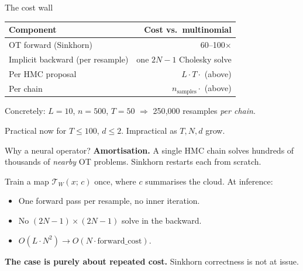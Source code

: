 \documentclass[10pt,aspectratio=169]{beamer}
\newcommand{\Tmap}{\mathcal{T}}
\begin{document}
\begin{frame}{The cost wall}
  \begin{center}
  \begin{tabular}{lr}
    \toprule
    Component & Cost vs.\ multinomial \\
    \midrule
    OT forward (Sinkhorn) & 60--100$\times$ \\
    Implicit backward (per resample) & one $2N{-}1$ Cholesky solve \\
    Per HMC proposal & $L \cdot T \cdot$ (above) \\
    Per chain & $n_\text{samples} \cdot$ (above) \\
    \bottomrule
  \end{tabular}
  \end{center}

  \medskip
  Concretely: $L{=}10$, $n{=}500$, $T{=}50$ $\Rightarrow$ 250{,}000 resamples \emph{per chain}.

  \medskip
  Practical now for $T \le 100$, $d \le 2$. Impractical as $T, N, d$ grow.
\end{frame}

\begin{frame}{Why a neural operator?}
  \textbf{Amortisation.} A single HMC chain solves hundreds of thousands of \emph{nearby} OT problems. Sinkhorn restarts each from scratch.

  \medskip
  Train a map $\Tmap_W(x;\, c)$ once, where $c$ summarises the cloud. At inference:
  \begin{itemize}
    \item One forward pass per resample, no inner iteration.
    \item No $(2N{-}1) \times (2N{-}1)$ solve in the backward.
    \item $O(L \cdot N^2) \rightarrow O(N \cdot \text{forward\_cost})$.
  \end{itemize}

  \medskip
  \textbf{The case is purely about repeated cost.} Sinkhorn correctness is not at issue.
\end{frame}
\end{document}
